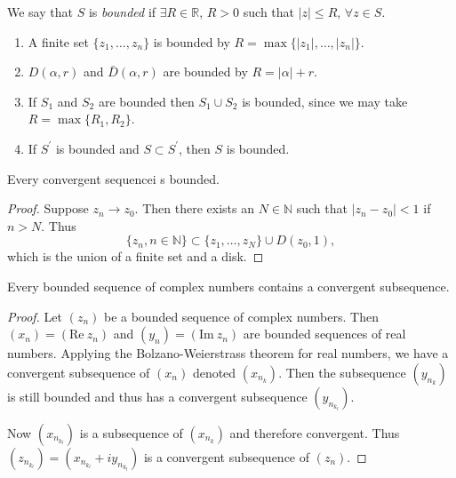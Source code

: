 \begin{defn}[Boundedness]
  We say that $S$ is \emph{bounded} if
  $\exists R \in \mathbb{R}$, $R > 0$ such that $|z| \leq R$,
  $\forall z \in S$.
\end{defn}

\begin{xmpl}
  \begin{enumerate}
    \item{
      A finite set $\{ z_1, \dots, z_n \}$ is bounded by
      $R = \max \{ |z_1|, \dots, |z_n| \}$.
    }
    \item{
      $D(\alpha, r)$ and $\bar{D}(\alpha, r)$ are bounded
      by $R = |\alpha| + r$.
    }
    \item{
      If $S_1$ and $S_2$ are bounded then $S_1 \cup S_2$ is bounded,
      since we may take $R = \max \{ R_1, R_2 \}$.
    }
    \item{
      If $S^\prime$ is bounded and $S \subset S^\prime$, then $S$ is bounded.
    }
  \end{enumerate}
\end{xmpl}

\begin{theorem}
  Every convergent sequencei s bounded.
\end{theorem}

\begin{proof}
  Suppose $z_n \to z_0$. Then there exists an $N \in \mathbb{N}$ such that
  $|z_n - z_0| < 1$ if $n > N$. Thus
  $$
  \{ z_n, n \in \mathbb{N} \} \subset \{ z_1, \dots, z_N \} \cup D(z_0, 1),
  $$
  which is the union of a finite set and a disk.
\end{proof}

\begin{theorem}
  Every bounded sequence of complex numbers contains a convergent
  subsequence.
\end{theorem}
\begin{proof}
  Let $(z_n)$ be a bounded sequence of complex numbers. Then
  $(x_n) = (\mathrm{Re}~z_n)$ and $(y_n) = (\mathrm{Im}~z_n)$ are bounded
  sequences of real numbers. Applying the Bolzano-Weierstrass theorem
  for real numbers, we have a convergent subsequence of $(x_n)$
  denoted $(x_{n_k})$. Then the subsequence $(y_{n_k})$ is still bounded
  and thus has a convergent subsequence $(y_{n_{k_l}})$.

  Now $(x_{n_{k_l}})$ is a subsequence of $(x_{n_k})$ and therefore convergent.
  Thus $(z_{n_{k_l}}) = (x_{n_{k_l}} + i y_{n_{k_l}})$ is a convergent subsequence of
  $(z_n)$.
\end{proof}

